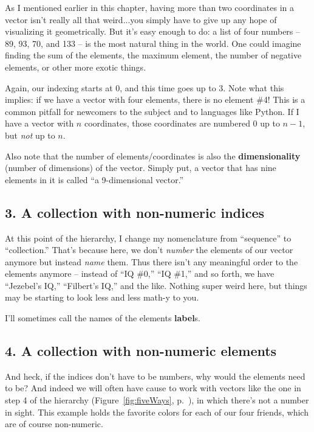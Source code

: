 As I mentioned earlier in this chapter, having more than two coordinates in a
vector isn't really all that weird...you simply have to give up any hope of
visualizing it geometrically. But it's easy enough to do: a list of four
numbers -- 89, 93, 70, and 133 -- is the most natural thing in the world. One
could imagine finding the sum of the elements, the maximum element, the number
of negative elements, or other more exotic things.

Again, our indexing starts at 0, and this time goes up to 3. Note what this
implies: if we have a vector with four elements, there is no element \#4! This
is a common pitfall for newcomers to the subject and to languages like Python.
If I have a vector with $n$ coordinates, those coordinates are numbered 0 up to 
$n-1$, but \textit{not} up to $n$.

Also note that the number of elements/coordinates is also the
\textbf{dimensionality} (number of dimensions) of the vector. Simply put, a
vector that has nine elements in it is called ``a 9-dimensional vector.''

\subsection{3. A collection with non-numeric indices}

At this point of the hierarchy, I change my nomenclature from ``sequence'' to
``collection.'' That's because here, we don't \textit{number} the elements of
our vector anymore but instead \textit{name} them. Thus there isn't any
meaningful order to the elements anymore -- instead of ``IQ \#0,'' ``IQ \#1,''
and so forth, we have ``Jezebel's IQ,'' ``Filbert's IQ,'' and the like. Nothing
super weird here, but things may be starting to look less and less math-y to
you.


I'll sometimes call the names of the elements \textbf{label}s.


\subsection{4. A collection with non-numeric elements}

And heck, if the indices don't have to be numbers, why would the elements need
to be? And indeed we will often have cause to work with vectors like the one in
step 4 of the hierarchy (Figure~\ref{fig:fiveWays}, p.~\pageref{fig:fiveWays}),
in which there's not a number in sight. This example holds the favorite colors
for each of our four friends, which are of course non-numeric.

